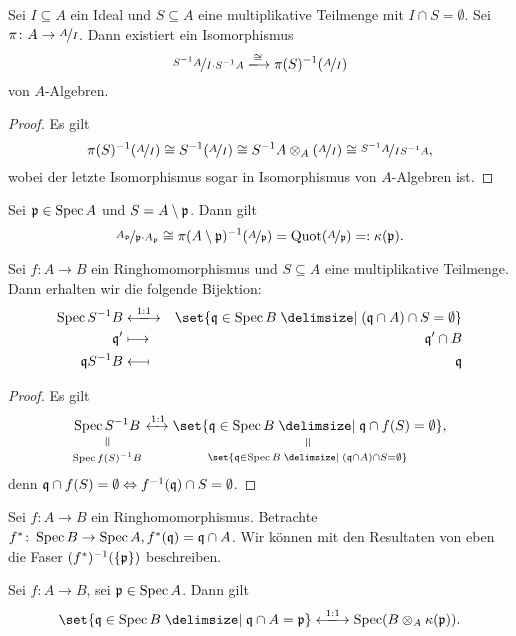\documentclass[12pt,a4paper]{scrartcl}
\theoremstyle{cplain}
\theoremstyle{cdef}
\begin{document}
\begin{kor}
	Sei $I\subseteq A$ ein Ideal und $S\subseteq A$ eine multiplikative Teilmenge mit $I\cap S = \emptyset$. Sei $\pi\colon A \to \nicefrac{A}{I}$. Dann existiert ein Isomorphismus
	\[\fak{S^{-1}A}{I\cdot S^{-1}A} \xlongrightarrow{\cong} \pi(S)^{-1}(\fak{A}{I})\]
	von $A$-Algebren.
\end{kor}
\begin{proof}
	Es gilt
	\[\pi(S)^{-1}(\nicefrac{A}{I}) \cong S^{-1}(\nicefrac{A}{I}) \cong S^{-1}A\otimes_A(\nicefrac{A}{I}) \cong \nicefrac{S^{-1}A}{IS^{-1}A},\]
	wobei der letzte Isomorphismus sogar in Isomorphismus von $A$-Algebren ist.
\end{proof}
\begin{kor} \label{kor:5.18}
	Sei $\mathfrak{p}\in \operatorname{Spec} A$ und $S = A\setminus \mathfrak{p}$. Dann gilt
	\[\nicefrac{A_{\mathfrak{p}}}{\mathfrak{p}\cdot A_{\mathfrak{p}}}\cong \pi(A\setminus \mathfrak{p})^{-1}(\nicefrac{A}{\mathfrak{p}}) = \operatorname{Quot}(\nicefrac{A}{\mathfrak{p}}) =: \kappa(\mathfrak{p}).\]
\end{kor}
\begin{kor} \label{kor:5.19}
Sei $f\colon A\to B$ ein Ringhomomorphismus und $S\subseteq A$ eine multiplikative Teilmenge. Dann erhalten wir die folgende Bijektion:
\begin{eqnarray*}
	\Spec S^{-1}B & \xlongleftrightarrow{1:1} & \set{\fq \in \Spec B \given (\fq \cap A)\cap S = \emptyset}\\
	\fq' & \longmapsto & \fq'\cap B\\
	\fq S^{-1}B & \longmapsfrom & \fq
\end{eqnarray*}
\end{kor}
\begin{proof}
	Es gilt \[
		\equalto{\Spec S^{-1}B}{\Spec f(S)^{-1}B} 
		\xleftrightarrow{1:1} 
		\equalto{\set{\fq \in \Spec B\given\fq\cap f(S) = \emptyset}}{\set{\fq \in \Spec B\given(\fq \cap A)\cap S = \emptyset}},
	\]
	 denn $\mathfrak{q}\cap f(S) = \emptyset \Leftrightarrow f^{-1}(\mathfrak{q})\cap S = \emptyset$.
\end{proof}
Sei $f\colon A \to B$ ein Ringhomomorphismus. Betrachte $f^{*}\colon \operatorname{Spec} B \to \operatorname{Spec} A, f^{*}(\mathfrak{q}) = \mathfrak{q}\cap A$. Wir können mit den Resultaten von eben die Faser $(f^{*})^{-1}(\{\mathfrak{p}\})$ beschreiben.
\begin{kor}
	Sei $f\colon A \to B$, sei $\mathfrak{p}\in \operatorname{Spec} A$. Dann gilt
	\[\set{\fq\in \Spec B\given\fq\cap A = \fp}\xlongleftrightarrow{1:1}\Spec(B\tp_A\kappa(\fp)).\]
\end{kor}
\end{document}
